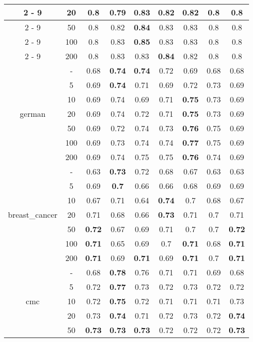 \documentclass{article}%
\begin{document}
\begin{longtable}{c|c|ccccccc}
\cline{2%
-%
9}%
&20&0.8&0.79&\textbf{0.83}&0.82&0.82&0.8&0.8\\%
\cline{2%
-%
9}%
&50&0.8&0.82&\textbf{0.84}&0.83&0.83&0.8&0.8\\%
\cline{2%
-%
9}%
&100&0.8&0.83&\textbf{0.85}&0.83&0.83&0.8&0.8\\%
\cline{2%
-%
9}%
&200&0.8&0.83&0.83&\textbf{0.84}&0.82&0.8&0.8\\%
\hline%
\multirow{7}{*}{german}&{-}&0.68&\textbf{0.74}&\textbf{0.74}&0.72&0.69&0.68&0.68\\%
\cline{2%
-%
9}%
&5&0.69&\textbf{0.74}&0.71&0.69&0.72&0.73&0.69\\%
\cline{2%
-%
9}%
&10&0.69&0.74&0.69&0.71&\textbf{0.75}&0.73&0.69\\%
\cline{2%
-%
9}%
&20&0.69&0.74&0.72&0.71&\textbf{0.75}&0.73&0.69\\%
\cline{2%
-%
9}%
&50&0.69&0.72&0.74&0.73&\textbf{0.76}&0.75&0.69\\%
\cline{2%
-%
9}%
&100&0.69&0.73&0.74&0.74&\textbf{0.77}&0.75&0.69\\%
\cline{2%
-%
9}%
&200&0.69&0.74&0.75&0.75&\textbf{0.76}&0.74&0.69\\%
\hline%
\multirow{7}{*}{breast\_cancer}&{-}&0.63&\textbf{0.73}&0.72&0.68&0.67&0.63&0.63\\%
\cline{2%
-%
9}%
&5&0.69&\textbf{0.7}&0.66&0.66&0.68&0.69&0.69\\%
\cline{2%
-%
9}%
&10&0.67&0.71&0.64&\textbf{0.74}&0.7&0.68&0.67\\%
\cline{2%
-%
9}%
&20&0.71&0.68&0.66&\textbf{0.73}&0.71&0.7&0.71\\%
\cline{2%
-%
9}%
&50&\textbf{0.72}&0.67&0.69&0.71&0.7&0.7&\textbf{0.72}\\%
\cline{2%
-%
9}%
&100&\textbf{0.71}&0.65&0.69&0.7&\textbf{0.71}&0.68&\textbf{0.71}\\%
\cline{2%
-%
9}%
&200&\textbf{0.71}&0.69&\textbf{0.71}&0.69&\textbf{0.71}&0.7&\textbf{0.71}\\%
\hline%
\multirow{7}{*}{cmc}&{-}&0.68&\textbf{0.78}&0.76&0.71&0.71&0.69&0.68\\%
\cline{2%
-%
9}%
&5&0.72&\textbf{0.77}&0.73&0.72&0.73&0.72&0.72\\%
\cline{2%
-%
9}%
&10&0.72&\textbf{0.75}&0.72&0.71&0.71&0.71&0.73\\%
\cline{2%
-%
9}%
&20&0.73&\textbf{0.74}&0.71&0.72&0.73&0.72&\textbf{0.74}\\%
\cline{2%
-%
9}%
&50&\textbf{0.73}&\textbf{0.73}&\textbf{0.73}&0.72&0.72&0.72&\textbf{0.73}\\%

\end{longtable}
\end{document}
